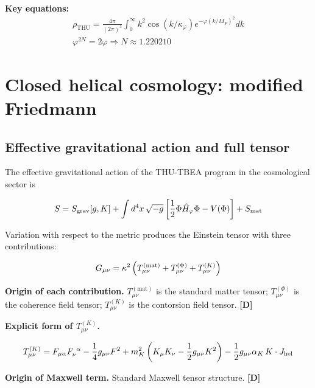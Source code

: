 ﻿\documentclass[11pt,letterpaper]{article}
\begin{document}
\textbf{Key equations:}
\begin{align*}
    \rho_{\mathrm{THU}} = \frac{4\pi}{(2\pi)^3}\int_0^\infty k^2 \cos(k/\kappa_\varphi) e^{-\varphi(k/M_P)^2} dk \\
    \varphi^{2N} = 2\varphi \Rightarrow N \approx 1.220210
\end{align*}
\section{Closed helical cosmology: modified Friedmann}
\subsection{Effective gravitational action and full tensor}
The effective gravitational action of the THU-TBEA program in the cosmological sector is

\begin{equation*}
  \resizebox{\ifdim\width>\linewidth \linewidth\else\width\fi}{!}{$\displaystyle S = S_{\text{grav}}[g, K] + \int d^4x\,\sqrt{-g}\left[\frac{1}{2}\Phi\hat{H}_\varphi\Phi - V(\Phi)\right] + S_{\text{mat}}$}
\end{equation*}

Variation with respect to the metric produces the Einstein tensor with three contributions:

\begin{equation*}
  \resizebox{\ifdim\width>\linewidth \linewidth\else\width\fi}{!}{$\displaystyle G_{\mu\nu} = \kappa^2\left(T_{\mu\nu}^{(\text{mat})} + T_{\mu\nu}^{(\Phi)} + T_{\mu\nu}^{(K)}\right)$}
\end{equation*}

\textbf{Origin of each contribution.} $T_{\mu\nu}^{(\text{mat})}$ is the standard matter tensor; $T_{\mu\nu}^{(\Phi)}$ is the coherence field tensor; $T_{\mu\nu}^{(K)}$ is the contorsion field tensor. \textbf{[D]}

\textbf{Explicit form of $T_{\mu\nu}^{(K)}$.}

\begin{equation*}
  \resizebox{\ifdim\width>\linewidth \linewidth\else\width\fi}{!}{$\displaystyle T_{\mu\nu}^{(K)} = F_{\mu\alpha}F_\nu^{\ \alpha} - \frac{1}{4}g_{\mu\nu}F^2 + m_K^2\left(K_\mu K_\nu - \frac{1}{2}g_{\mu\nu}K^2\right) - \frac{1}{2}g_{\mu\nu}\alpha_K\,K\cdot J_{\text{hel}}$}
\end{equation*}

\textbf{Origin of Maxwell term.} Standard Maxwell tensor structure. \textbf{[D]}
\end{document}
